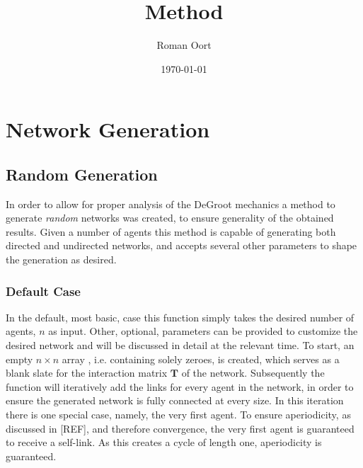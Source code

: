 \documentclass{article}
\title{Method}
\author{Roman Oort}
\date{\today}
\newcommand{\T}{\textbf{T}}
\begin{document}
\maketitle

\tableofcontents
\newpage

\section{Network Generation}

\subsection{Random Generation}
\label{generation:random}
In order to allow for proper analysis of the DeGroot mechanics a method to generate \emph{random} networks was created, to ensure generality of the obtained results. Given a number of agents this method is capable of generating both directed and undirected networks, and accepts several other parameters to shape the generation as desired.

\subsubsection{Default Case}
In the default, most basic, case this function simply takes the desired number of agents, $n$ as input. Other, optional, parameters can be provided to customize the desired network and will be discussed in detail at the relevant time.
To start, an empty $n\times n$ array \cite{2020NumPy-Array}, i.e. containing solely zeroes, is created, which serves as a blank slate for the interaction matrix $\T$ of the network.
Subsequently the function will iteratively add the links for every agent in the network, in order to ensure the generated network is fully connected at every size. \newline
In this iteration there is one special case, namely, the very first agent. To ensure aperiodicity, as discussed in [REF], and therefore convergence, the very first agent is guaranteed to receive a self-link. As this creates a cycle of length one, aperiodicity is guaranteed. \newline
\end{document}
